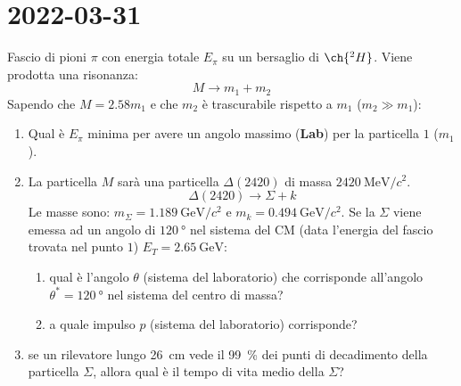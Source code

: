 \chapter{2022-03-31}
\begin{example}[]
  Fascio di pioni $\pi$ con energia totale $E _{\pi}$ su un bersaglio di
  $\ch{^{2}H}$. Viene prodotta una risonanza:
  \[
    M \rightarrow m_1 + m_2
  \]
  Sapendo che $M = 2.58 m_1$ e che $m_2$ è trascurabile rispetto a $m_1$ ($m_2
  \gg m_1$):
  \begin{enumerate}
    \item Qual è $E _{\pi}$ minima per avere un angolo massimo (\textbf{Lab})
      per la particella $1$ ($m_1$).
    \item La particella $M$ sarà una particella $\Delta (2420)$ di massa
      $\SI{2420}{\MeV \per c^2}$.
      \[
        \Delta (2420) \rightarrow \Sigma + k
      \]
      Le masse sono: $m _{\Sigma} = \SI{1.189}{\GeV \per c^2}$ e $m _{k} =
      \SI{0.494}{\GeV \per c^2}$.
      Se la $\Sigma$ viene emessa ad un angolo di $\SI{120}{\degree}$ nel
      sistema del CM (data l'energia del fascio trovata nel punto $1$) $E _{T}
      = \SI{2.65}{\GeV}$:
      \begin{enumerate}
        \item qual è l'angolo $\theta$ (sistema del laboratorio) che
          corrisponde all'angolo $\theta^\ast = \SI{120}{\degree}$ nel
          sistema del centro di massa?
        \item a quale impulso $p$ (sistema del laboratorio) corrisponde?
      \end{enumerate}
    \item se un rilevatore lungo \SI{26}{\cm} vede il \SI{99}{\%} dei punti di
      decadimento della particella $\Sigma$, allora qual è il tempo di vita
      medio della $\Sigma$?
  \end{enumerate}


\end{example}
